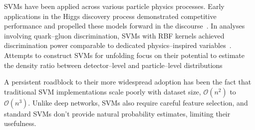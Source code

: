             SVMs have been applied across various particle physics processes.
            Early applications in the Higgs discovery process demonstrated competitive performance and propelled these models forward in the discourse~\cite{bevan_support_2017}.
            In analyses involving quark--gluon discrimination, SVMs with RBF kernels achieved discrimination power comparable to dedicated physics--inspired variables~\cite{sforza_support_2013, Anguita2004ModelClassifier}.
            Attempts to construct SVMs for unfolding focus on their potential to estimate the density ratio between detector--level and particle--level distributions
            
            A persistent roadblock to their more widespread adoption has been the fact that traditional SVM implementations scale poorly with dataset size, \(\mathcal O(n^2)\) to \(\mathcal O(n^3)\).
            Unlike deep networks, SVMs also require careful feature selection, and standard SVMs don't provide natural probability estimates, limiting their usefulness.
    
